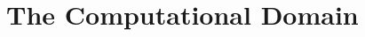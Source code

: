 \documentclass[11pt, a4paper]{article}
\newcommand{\parder}[2]{\frac{\partial {#1}}{\partial {#2}}}
\begin{document}


\section{The Computational Domain}
\end{document}

